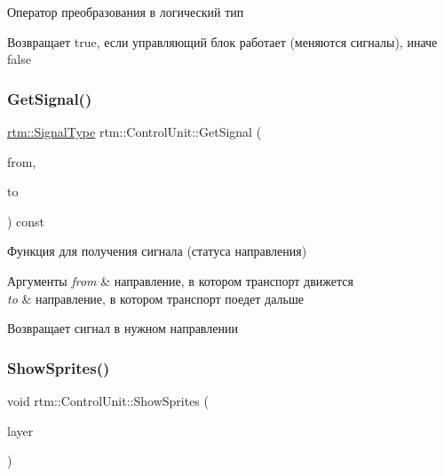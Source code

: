 Оператор преобразования в логический тип 

\begin{DoxyReturn}{Возвращает}
true, если управляющий блок работает (меняются сигналы), иначе false 
\end{DoxyReturn}
\mbox{\label{classrtm_1_1_control_unit_afa3dcc399f2f5b7d0c1451aa65977da6}} 
\subsubsection{\texorpdfstring{Get\+Signal()}{GetSignal()}}
{\footnotesize\ttfamily \hyperlink{namespacertm_aadb7300c15d57429546fb0b7f8ee0ee6}{rtm\+::\+Signal\+Type} rtm\+::\+Control\+Unit\+::\+Get\+Signal (\begin{DoxyParamCaption}\item[{\hyperlink{namespacertm_a57b216f3aeb45041f3461bab08bc3aeb}{Direction\+Type}}]{from,  }\item[{\hyperlink{namespacertm_a57b216f3aeb45041f3461bab08bc3aeb}{Direction\+Type}}]{to }\end{DoxyParamCaption}) const}



Функция для получения сигнала (статуса направления) 


\begin{DoxyParams}{Аргументы}
{\em from} & направление, в котором транспорт движется \\
\hline
{\em to} & направление, в котором транспорт поедет дальше \\
\hline
\end{DoxyParams}
\begin{DoxyReturn}{Возвращает}
сигнал в нужном направлении 
\end{DoxyReturn}
\mbox{\label{classrtm_1_1_control_unit_af126b136af6883970ded2a592c90d2b1}} 
\subsubsection{\texorpdfstring{Show\+Sprites()}{ShowSprites()}}
{\footnotesize\ttfamily void rtm\+::\+Control\+Unit\+::\+Show\+Sprites (\begin{DoxyParamCaption}\item[{cocos2d\+::\+Layer $\ast$const}]{layer }\end{DoxyParamCaption})}



